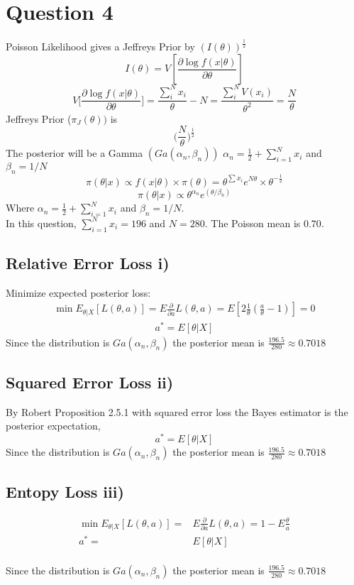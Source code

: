 \documentclass{article}
\begin{document}

\section*{Question 4}
Poisson Likelihood gives a Jeffreys Prior by $ (I(\theta))^{\frac{1}{2}} $
$$
I(\theta) =  V [ \frac{\partial \log f(x|\theta)}{\partial \theta} ]
$$
$$
V \Big[\frac{\partial \log f(x|\theta)}{\partial \theta}\Big] = \frac{\sum_i^N x_i}{\theta} - N =  \frac{\sum_i^N V(x_i)}{\theta^2} = \frac{N}{\theta} 
$$
Jeffreys Prior ($\pi_J(\theta)) $ is 
$$
\Big(\frac{N}{\theta}\Big)^{\frac{1}{2}}
$$
The posterior will be a Gamma $(Ga(\alpha_n, \beta_n))$ $\alpha_n = \frac{1}{2} + \sum_{i=1}^N x_i $ and $\beta_n = 1/N $
$$
\pi(\theta|x) \propto f(x|\theta)\times \pi(\theta) =  \theta^{\sum x_i} e^{N\theta} \times \theta^{-\frac{1}{2}}
$$
$$
\pi(\theta|x) \propto \theta^{\alpha_n} e^{(\theta/\beta_n)}
$$
Where $\alpha_n = \frac{1}{2} + \sum_{i=1}^N x_i $ and $\beta_n = 1/N $.
\\
In this question, $ \sum_{i=1}^N x_i = 196 $  and $ N = 280 $. The Poisson mean is $ 0.70 $. 

\subsection*{Relative Error Loss i)}
Minimize expected posterior loss:
\begin{align*}
\min E_{\theta|X}[L(\theta, a)] = E \frac{\partial}{\partial a} L(\theta, a) =E[ 2\frac{1}{\theta}(\frac{a}{\theta} - 1)] = 0
\end{align*}
\begin{align*}
a^* = E[\theta|X]
\end{align*}
Since the  distribution is $Ga(\alpha_n, \beta_n)$ the posterior mean is $\frac{196.5}{280} \approx 0.7018$
\subsection*{Squared Error Loss ii)}
By Robert Proposition 2.5.1 with squared error loss the Bayes estimator is the posterior expectation,
$$
a^* = E[\theta|X]
$$
Since the  distribution is $Ga(\alpha_n, \beta_n)$ the posterior mean is $\frac{196.5}{280} \approx 0.7018$
\subsection*{Entopy Loss iii)}

\begin{align*}
\min E_{\theta|X} [L(\theta, a)] = & E \frac{\partial}{\partial a} L(\theta, a) = 1 -E \frac{\theta}{a} \\
a^*  =& E[\theta|X] 
\end{align*}
\\
Since the  distribution is $Ga(\alpha_n, \beta_n)$ the posterior mean is $\frac{196.5}{280} \approx 0.7018$
\end{document}
